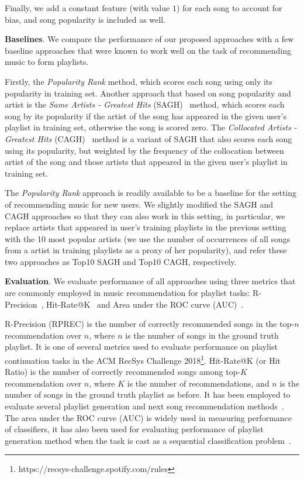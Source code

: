 Finally, we add a constant feature (with value $1$) for each song to account for bias, and song popularity is included as well.


{\bf Baselines}.
We compare the performance of our proposed approaches with a few baseline approaches 
that were known to work well on the task of recommending music to form playlists.

Firstly, the {\it Popularity Rank} method, which scores each song using only its popularity in training set.
%
Another approach that based on song popularity and artist is the {\it Same Artists - Greatest Hits} (SAGH)~\cite{mcfee2012million} method,
which scores each song by its popularity if the artist of the song has appeared in the given user's playlist in training set, 
otherwise the song is scored zero.
%
The {\it Collocated Artists - Greatest Hits} (CAGH)~\cite{bonnin2013evaluating} method is a variant of SAGH
that also scores each song using its popularity, but weighted by the frequency of the collocation between artist of the song 
and those artists that appeared in the given user's playlist in training set.

The {\it Popularity Rank} approach is readily available to be a baseline for the setting of recommending music for new users.
%
We slightly modified the SAGH and CAGH approaches so that they can also work in this setting,
in particular, we replace artists that appeared in user's training playlists in the previous setting with the 10 most popular artists
(we use the number of occurrences of all songs from a artist in training playlists as a proxy of her popularity),
and refer these two approaches as Top10 SAGH and Top10 CAGH, respectively.


{\bf Evaluation}.
We evaluate performance of all approaches using three metrics that are commonly employed in music recommendation for playlist tasks:
R-Precision~\cite{manning2008introIR}, Hit-Rate@K~\cite{hariri2012context} and Area under the ROC curve (AUC)~\cite{manning2008introIR}.

R-Precision (RPREC) is the number of correctly recommended songs in the top-$n$ recommendation over $n$,
where $n$ is the number of songs in the ground truth playlist.
It is one of several metrics used to evaluate performance on playlist continuation tasks 
in the ACM RecSys Challenge 2018\footnote{https://recsys-challenge.spotify.com/rules}.
%
Hit-Rate@K (or Hit Ratio) is the number of correctly recommended songs among top-$K$ recommendation over $n$,
where $K$ is the number of recommendations, and $n$ is the number of songs in the ground truth playlist as before.
It has been employed to evaluate several playlist generation and next song recommendation 
methods~\cite{hariri2012context,bonnin2013evaluating,bonnin2015automated,jannach2015beyond}.
%
The area under the ROC curve (AUC) is widely used in measuring performance of classifiers,
it has also been used for evaluating performance of playlist generation method when the task
is cast as a sequential classification problem~\cite{ben2017groove}.



